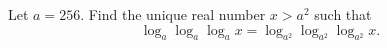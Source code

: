 Let $a=256$. Find the unique real number $x>a^2$ such that\[\log_a \log_a \log_a x = \log_{a^2} \log_{a^2} \log_{a^2} x.\]